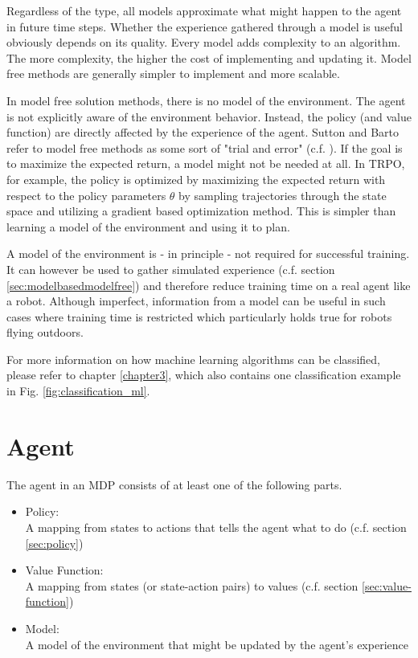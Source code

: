 Regardless of the type, all models approximate what might happen to the agent in future time steps. Whether the experience gathered through a model is useful obviously depends on its quality. Every model adds complexity to an algorithm. The more complexity, the higher the cost of implementing and updating it. Model free methods are generally simpler to implement and more scalable. 

In model free solution methods, there is no model of the environment. The agent is not explicitly aware of the environment behavior. Instead, the policy (and value function) are directly affected by the experience of the agent. Sutton and Barto refer to model free methods as some sort of "trial and error" (c.f. \cite[section~1.5]{SuttonBarto2018}). If the goal is to maximize the expected return, a model might not be needed at all. In TRPO, for example, the policy is optimized by maximizing the expected return with respect to the policy parameters $\theta$ by sampling trajectories through the state space and utilizing a gradient based optimization method. This is simpler than learning a model of the environment and using it to plan.

A model of the environment is - in principle - not required for successful training. It can however be used to gather simulated experience (c.f. section \ref{sec:modelbasedmodelfree}) and therefore reduce training time on a real agent like a robot. Although imperfect, information from a model can be useful in such cases where training time is restricted which particularly holds true for robots flying outdoors.

For more information on how machine learning algorithms can be classified, please refer to chapter \ref{chapter3}, which also contains one classification example in Fig. \ref{fig:classification_ml}.

\section{Agent}

The agent in an MDP consists of at least one of the following parts.

\begin{itemize}
	\item Policy: \\
	A mapping from states to actions that tells the agent what to do (c.f. section \ref{sec:policy})
	\item Value Function: \\
	A mapping from states (or state-action pairs) to values (c.f. section \ref{sec:value-function})
	\item Model: \\
	A model of the environment that might be updated by the agent's experience
\end{itemize}

